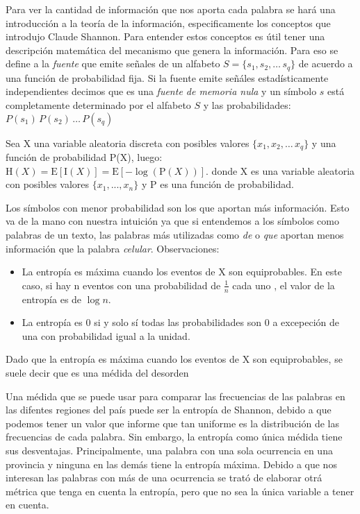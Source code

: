 Para ver la cantidad de información que nos aporta cada palabra se hará una introducción a la teoría de la información, especificamente
los conceptos que introdujo Claude Shannon\cite{shannon2001mathematical}.
Para entender estos conceptos es útil tener una descripción matemática del mecanismo que genera la información. Para eso se define a 
la \textit{fuente} que emite señales de un alfabeto $ S = \{s_1, s_2, \dots\, s_q\}$ de acuerdo a una función de probabilidad fija.
Si la fuente emite señáles estadísticamente independientes decimos que es una \textit{fuente de memoria nula} y un símbolo $s$ está completamente determinado por el alfabeto $S$ y las probabilidades:
$P(s_1)\,P(s_2)\, \dots\, P(s_q)$

Sea X una variable aleatoria discreta con posibles valores $\{x_1, x_2, \dots\, x_q\}$ y una función de probabilidad P(X), luego:
${\displaystyle \mathrm {H} (X)=\mathrm {E} [\mathrm {I} (X)]=\mathrm {E} [-\log(\mathrm {P} (X))].}$
donde X es una variable aleatoria con posibles valores $\{x_1, ... , x_n\}$ y P es una función de probabilidad.

Los símbolos con menor probabilidad son los que aportan más información. Esto va de la mano con nuestra intuición ya que si entendemos a los símbolos como palabras de un texto, las palabras más utilizadas como \textit{de} o \textit{que} aportan menos información que la palabra \textit{celular}. 
Observaciones:
\begin{itemize}
    \item La entropía es máxima cuando los eventos de X son equiprobables. En este caso, si hay n eventos con una probabilidad de $\frac{1}{n}$ cada uno , el valor de la entropía es de $\log n$.
    \item La entropía es 0 si y solo sí todas las probabilidades son 0 a excepeción de una con probabilidad igual a la unidad. 
\end{itemize}

Dado que la entropía es máxima cuando los eventos de X son equiprobables, se suele decir que es una médida del desorden

Una médida que se puede usar para comparar las frecuencias de las palabras en las difentes regiones del país puede ser la entropía de Shannon, debido a que podemos tener un valor que informe que tan uniforme es la distribución de las frecuencias de cada palabra.
Sin embargo, la entropía como única médida tiene sus desventajas. Principalmente, una palabra con una sola ocurrencia en una provincia y ninguna en las demás tiene la entropía máxima. Debido a que nos interesan las palabras con más de una ocurrencia se trató de elaborar otrá métrica que tenga en cuenta la entropía, pero que no sea la única variable a tener en cuenta.


